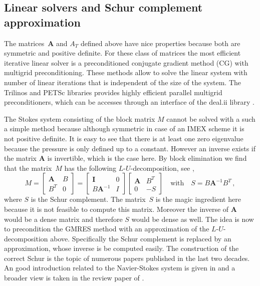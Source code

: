 \documentclass[review]{revtex4-1}
\begin{document}
\subsection{Linear solvers and Schur complement approximation}
The matrices~$\bm{A}$ and $A_T$ defined above have nice properties because both are symmetric and positive definite. For these class of matrices the most efficient iterative linear solver is a preconditioned conjugate gradient method (CG) with multigrid preconditioning. These methods allow to solve the linear system with number of linear iterations that is independent of the size of the system. The Trilinos and PETSc libraries provides highly efficient parallel multigrid preconditioners, which can be accesses through an interface of the deal.ii library \cite{deal.ii-9.0,Trilinos,PETSc}.

The Stokes system consisting of the block matrix $M$ cannot be solved with a such a simple method because although symmetric in case of an IMEX scheme it is not positive definite. It is easy to see that there is at least one zero eigenvalue because the pressure is only defined up to a constant. However an inverse exists if the matrix $\mathbf{A}$ is invertible, which is the case here. By block elimination we find that the matrix~$M$ has the following $L$-$U$-decomposition, see \cite{Elman2014},
\begin{equation}
	M
	=\begin{bmatrix} \mathbf{A} & B\\ B^T & 0 \end{bmatrix}
	=\begin{bmatrix} \mathbf{I} & 0\\ B\mathbf{A}^{-1} & I \end{bmatrix}
	\begin{bmatrix} \mathbf{A} & B^T\\ 0 & -S \end{bmatrix}\quad\text{with}\quad
	S=B\mathbf{A}^{-1}B^T\,,
	\label{eqn:StokesLU}
\end{equation}
where $S$ is the Schur complement. The matrix~$S$ is the magic ingredient here because it is not feasible to compute this matrix. Moreover the inverse of $\mathbf{A}$ would be a dense matrix and therefore $S$ would be dense as well. The idea is now to precondition the GMRES method with an approximation of the $L$-$U$-decomposition above. Specifically the Schur complement is replaced by an approximation, whose inverse is be computed easily. The construction of the correct Schur is the topic of numerous papers published in the last two decades. An good introduction related to the Navier-Stokes system is given in \cite{Elman2014} and a broader view is taken in the review paper of \citeauthor{Benzi2005}.
\end{document}
